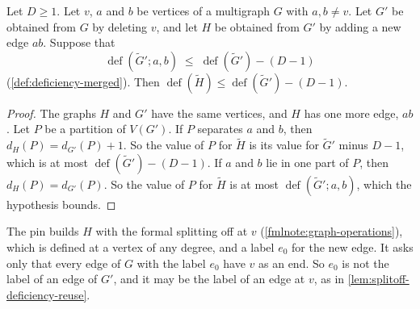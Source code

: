 \begin{lemma}
  \label{lem:splitoff-deficiency-merged}
  \leanok
  Let $D \ge 1$. Let $v$, $a$ and $b$ be vertices of a multigraph $G$
  with $a, b \neq v$. Let $G'$ be obtained from $G$ by deleting $v$, and
  let $H$ be obtained from $G'$ by adding a new edge $ab$. Suppose that
  \[
    \operatorname{def}(\tilde G'; a, b) \;\le\;
    \operatorname{def}(\tilde G') - (D - 1)
  \]
  (\cref{def:deficiency-merged}). Then
  $\operatorname{def}(\tilde H) \le \operatorname{def}(\tilde G') - (D - 1)$.
\end{lemma}
\begin{proof}
  \leanok
  The graphs $H$ and $G'$ have the same vertices, and $H$ has one more
  edge, $ab$. Let $P$ be a partition of $V(G')$. If $P$ separates $a$
  and $b$, then $d_H(P) = d_{G'}(P) + 1$. So the value of $P$ for
  $\tilde H$ is its value for $\tilde G'$ minus $D - 1$, which is at most
  $\operatorname{def}(\tilde G') - (D - 1)$. If $a$ and $b$ lie in one
  part of $P$, then $d_H(P) = d_{G'}(P)$. So the value of $P$ for
  $\tilde H$ is at most $\operatorname{def}(\tilde G'; a, b)$, which the
  hypothesis bounds.
\end{proof}
\begin{fmlnote}
  The pin builds $H$ with the formal splitting off at $v$
  (\cref{fmlnote:graph-operations}), which is defined at a vertex of any
  degree, and a label $e_0$ for the new edge. It asks only that every
  edge of $G$ with the label $e_0$ have $v$ as an end. So $e_0$ is not
  the label of an edge of $G'$, and it may be the label of an edge at
  $v$, as in \cref{lem:splitoff-deficiency-reuse}.
\end{fmlnote}

